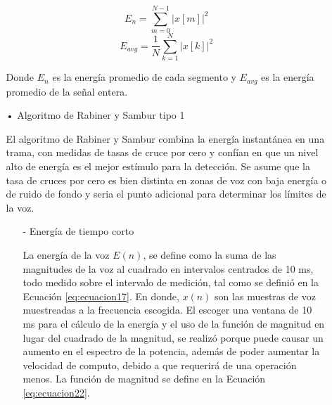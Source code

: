 \begin{enumerate}
\begin{enumerate}
\begin{equation}
\label{eq:ecuacion17}
E_{n} = \sum_{m=0}^{N-1}\left | x[m] \right |^{2}
\end{equation}
\vskip -0.5cm
\begin{equation}
\label{eq:ecuacion18}
E_{avg} = \frac{1}{N}\sum_{k=1}^{N}\left | x[k] \right |^{2}
\end{equation}

Donde $E_{n}$ es la energía promedio de cada segmento y $E_{avg}$ es la energía promedio de la señal entera.

\item[•]Algoritmo de Rabiner y Sambur tipo 1
\par
El algoritmo de Rabiner y Sambur combina la energía instantánea en una trama, con medidas de tasas de cruce por cero y confían en que un nivel alto de energía es el mejor estímulo para la detección. Se asume que la tasa de cruces por cero es bien distinta en zonas de voz con baja energía o de ruido de fondo y seria el punto adicional para determinar los límites de la voz.

\begin{enumerate}
\item[-]Energía de tiempo corto
\par
La energía de la voz $E(n)$, se define como la suma de las magnitudes de la voz al cuadrado en intervalos centrados de 10 ms, todo medido sobre el intervalo de medición, tal como se definió en la Ecuación \eqref{eq:ecuacion17}.
\vskip 0.5cm
En donde, $x(n)$ son las muestras de voz muestreadas a la frecuencia escogida. El escoger una ventana de 10 ms para el cálculo de la energía y el uso de la función de magnitud en lugar del cuadrado de la magnitud, se realizó porque puede causar un aumento en el espectro de la potencia, además de poder aumentar la velocidad de computo, debido a que requerirá de una operación menos. La función de magnitud se define en la Ecuación \eqref{eq:ecuacion22}.


\end{enumerate}
\end{enumerate}
\end{enumerate}
